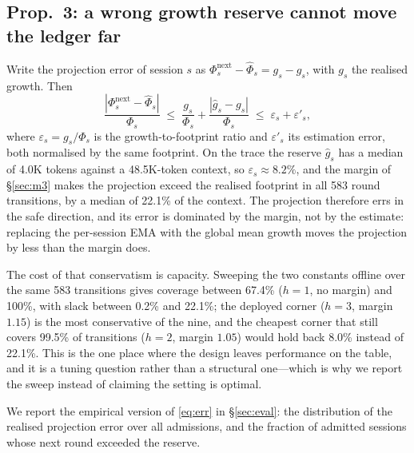 \subsection{Prop.~3: a wrong growth reserve cannot move the ledger far}

Write the projection error of session $s$ as
$\Phi_s^{\text{next}}-\hat\Phi_s = g_s-\hat g_s$, with $g_s$ the realised growth. Then
\begin{equation}
\frac{|\Phi_s^{\text{next}}-\hat\Phi_s|}{\Phi_s}
\;\le\;\frac{g_s}{\Phi_s}+\frac{|\hat g_s-g_s|}{\Phi_s}
\;\le\;\varepsilon_s+\varepsilon'_s ,
\label{eq:err}
\end{equation}
where $\varepsilon_s=g_s/\Phi_s$ is the growth-to-footprint ratio and $\varepsilon'_s$
its estimation error, both normalised by the same footprint. On the trace the reserve
$\hat g_s$ has a median of 4.0K tokens against a 48.5K-token context, so
$\varepsilon_s\approx8.2\%$, and the margin of \S\ref{sec:m3} makes the projection exceed
the realised footprint in all 583 round transitions, by a median of 22.1\% of the context.
The projection therefore errs in the safe direction, and its error is dominated by the
margin, not by the estimate: replacing the per-session EMA with the global mean growth
moves the projection by less than the margin does.

The cost of that conservatism is capacity. Sweeping the two constants offline over the same
583 transitions gives coverage between 67.4\% ($h=1$, no margin) and 100\%, with slack
between 0.2\% and 22.1\%; the deployed corner ($h=3$, margin $1.15$) is the most
conservative of the nine, and the cheapest corner that still covers 99.5\% of transitions
($h=2$, margin $1.05$) would hold back 8.0\% instead of 22.1\%. This is the one place where
the design leaves performance on the table, and it is a tuning question rather than a
structural one---which is why we report the sweep instead of claiming the setting is
optimal.

We report the empirical version of \eqref{eq:err} in \S\ref{sec:eval}: the distribution of
the realised projection error over all admissions, and the fraction of admitted sessions
whose next round exceeded the reserve.
